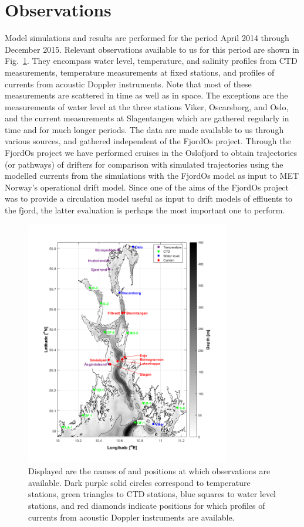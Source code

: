 \section{Observations}
\label{sec:obser}

Model simulations and results are performed for the period April 2014 through December 2015. Relevant observations available to us for this period are shown in Fig.~\ref{fig:kart_obs}. They encompass water level, temperature, and salinity profiles from CTD measurements, temperature measurements at fixed stations, and profiles of currents from acoustic Doppler instruments. Note that most of these measurements are scattered in time as well as in space. The exceptions are the measurements of water level at the three stations Viker, Oscarsborg, and Oslo, and the current measurements at Slagentangen which are gathered regularly in time and for much longer periods. The data are made available to us through various sources, and gathered independent of the FjordOs project. Through the FjordOs project we have performed cruises in the Oslofjord to obtain trajectories (or pathways) of drifters for comparison with simulated trajectories using the modelled currents from the simulations with the FjordOs model as input to MET Norway's operational drift model. Since one of the aims of the FjordOs project was to provide a circulation model useful as input to drift models of effluents to the fjord, the latter evaluation is perhaps the most important one to perform.

\begin{figure}[htb]
\centerline{
\includegraphics*[trim=0cm 0.8cm 0cm 0cm,clip=true,width=0.8\textwidth]{Figurer/kart_obs}
}
\caption{\small
Displayed are the names of and positions at which observations are available. Dark purple solid circles correspond to temperature stations, green triangles to CTD stations, blue squares to water level stations, and red diamonds indicate positions for which profiles of currents from acoustic Doppler instruments are available.
}
\label{fig:kart_obs}
\end{figure}

